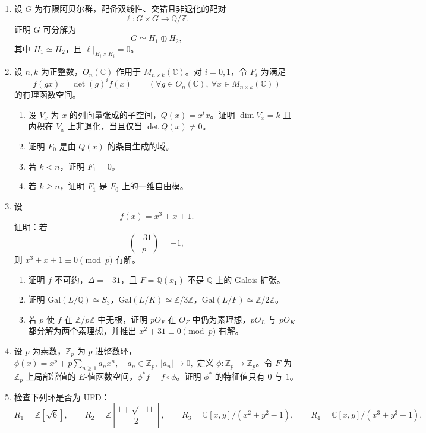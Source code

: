 \documentclass[UTF8,12pt]{ctexart}
\begin{document}
\begin{enumerate}[label=\textbf{\arabic*.},leftmargin=2.2em]
\item 设 \(G\) 为有限阿贝尔群，配备双线性、交错且非退化的配对
\[
\ell:G\times G\to \mathbb Q/\mathbb Z.
\]
证明 \(G\) 可分解为
\[
G\simeq H_1\oplus H_2,
\]
其中 \(H_1\simeq H_2\)，且 \(\ell|_{H_i\times H_i}=0\)。

\item 设 \(n,k\) 为正整数，\(O_n(\mathbb C)\) 作用于 \(M_{n\times k}(\mathbb C)\)。对 \(i=0,1\)，令 \(F_i\) 为满足
\[
 f(gx)=\det(g)^i f(x)\qquad(\forall g\in O_n(\mathbb C),\ \forall x\in M_{n\times k}(\mathbb C))
\]
的有理函数空间。
\begin{enumerate}[label=\textbf{(\alph*)},leftmargin=2.4em]
\item 设 \(V_x\) 为 \(x\) 的列向量张成的子空间，\(Q(x)=x^tx\)。证明 \(\dim V_x=k\) 且内积在 \(V_x\) 上非退化，当且仅当 \(\det Q(x)\ne0\)。
\item 证明 \(F_0\) 是由 \(Q(x)\) 的条目生成的域。
\item 若 \(k<n\)，证明 \(F_1=0\)。
\item 若 \(k\ge n\)，证明 \(F_1\) 是 \(F_0\)-上的一维自由模。
\end{enumerate}

\item 设
\[
 f(x)=x^3+x+1.
\]
证明：若
\[
 \left(\frac{-31}{p}\right)=-1,
\]
则 \(x^3+x+1\equiv0\pmod p\) 有解。
\begin{enumerate}[label=\textbf{(\alph*)},leftmargin=2.4em]
\item 证明 \(f\) 不可约，\(\Delta=-31\)，且 \(F=\mathbb Q(x_1)\) 不是 \(\mathbb Q\) 上的 Galois 扩张。
\item 证明 \(\mathrm{Gal}(L/\mathbb Q)\simeq S_3\)，\(\mathrm{Gal}(L/K)\simeq \mathbb Z/3\mathbb Z\)，\(\mathrm{Gal}(L/F)\simeq \mathbb Z/2\mathbb Z\)。
\item 若 \(p\) 使 \(f\) 在 \(\mathbb Z/p\mathbb Z\) 中无根，证明 \(pO_F\) 在 \(O_F\) 中仍为素理想，\(pO_L\) 与 \(pO_K\) 都分解为两个素理想，并推出 \(x^2+31\equiv0\pmod p\) 有解。
\end{enumerate}

\item 设 \(p\) 为素数，\(\mathbb Z_p\) 为 \(p\)-进整数环，\(
\phi(x)=x^p+p\sum_{n\ge1}a_nx^n,\quad a_n\in\mathbb Z_p,\ |a_n|\to0,
\)
定义 \(\phi:\mathbb Z_p\to\mathbb Z_p\)。令 \(F\) 为 \(\mathbb Z_p\) 上局部常值的 \(E\)-值函数空间，\(\phi^*f=f\circ\phi\)。证明 \(\phi^*\) 的特征值只有 \(0\) 与 \(1\)。

\item 检查下列环是否为 UFD：
\[
R_1=\mathbb Z[\sqrt6],\qquad
R_2=\mathbb Z\!\left[\frac{1+\sqrt{-11}}2\right],\qquad
R_3=\mathbb C[x,y]/(x^2+y^2-1),\qquad
R_4=\mathbb C[x,y]/(x^3+y^3-1).
\]
\end{enumerate}
\end{document}

